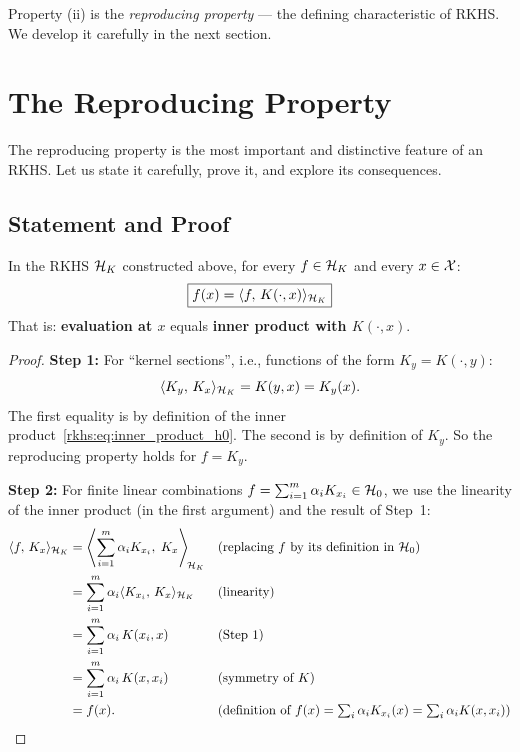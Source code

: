 \begin{notechapter}
Property (ii) is the \emph{reproducing property} --- the defining
characteristic of RKHS. We develop it carefully in the next section.


\section{The Reproducing Property}
\label{rkhs:sec:reproducing_property}

The reproducing property is the most important and distinctive feature
of an RKHS. Let us state it carefully, prove it, and explore its
consequences.

\subsection{Statement and Proof}

\begin{theorembox}
\begin{proposition}
\label{rkhs:prop:reproducing}
In the RKHS $\mathcal{H}_K$ constructed above, for every $f \in \mathcal{H}_K$ and every $x \in \mathcal{X}$:
\begin{equation}
\label{rkhs:eq:reproducing}
\boxed{f(x) = \langle f,\, K(\cdot, x) \rangle_{\mathcal{H}_K}}
\end{equation}
That is: \textbf{evaluation at $x$} equals \textbf{inner product with
$K(\cdot, x)$}.
\end{proposition}
\end{theorembox}

\begin{proof}
\textbf{Step 1:} For ``kernel sections'', i.e., functions of the form
$K_y = K(\cdot, y)$:
\[
\langle K_y,\, K_x \rangle_{\mathcal{H}_K} = K(y, x) = K_y(x).
\]
The first equality is by definition of the inner
product~\eqref{rkhs:eq:inner_product_h0}. The second is by definition of
$K_y$. So the reproducing property holds for $f = K_y$.

\textbf{Step 2:} For finite linear combinations
$f = \sum_{i=1}^m \alpha_i K_{x_i} \in \mathcal{H}_0$, we
use the linearity of the inner product (in the first
argument) and the result of Step~1:
\begin{align*}
\langle f,\, K_x \rangle_{\mathcal{H}_K}
&= \left\langle \sum_{i=1}^m \alpha_i K_{x_i},\;
   K_x \right\rangle_{\!\mathcal{H}_K}
   && \text{(replacing $f$ by its definition
   in $\mathcal{H}_0$)} \\
&= \sum_{i=1}^m \alpha_i
   \langle K_{x_i},\, K_x \rangle_{\mathcal{H}_K}
   && \text{(linearity)} \\
&= \sum_{i=1}^m \alpha_i\, K(x_i, x)
   && \text{(Step 1)} \\
&= \sum_{i=1}^m \alpha_i\, K(x, x_i)
   && \text{(symmetry of $K$)} \\
&= f(x).
   && \text{(definition of
   $f(x) = \textstyle\sum_i \alpha_i K_{x_i}(x)
   = \textstyle\sum_i \alpha_i K(x, x_i)$)}
\end{align*}


\end{proof}
\end{notechapter}
